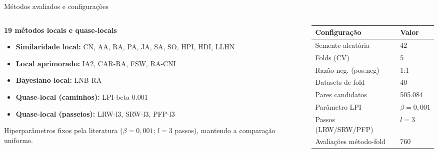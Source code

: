 \documentclass[aspectratio=169,11pt]{beamer}
\providecommand{\EspacoAposTitulo}{\vspace*{0.93cm}}
\begin{document}
\begin{frame}[t]{Métodos avaliados e configurações}

  \EspacoAposTitulo

  \begin{columns}[t]
    \begin{column}{0.56\textwidth}
      \textbf{19 métodos locais e quase-locais}
      \begin{itemize}
        \setlength{\itemsep}{0.12cm}
        \item \textbf{Similaridade local:} CN, AA, RA, PA, JA, SA, SO,
        HPI, HDI, LLHN
        \item \textbf{Local aprimorado:} IA2, CAR-RA, FSW, RA-CNI
        \item \textbf{Bayesiano local:} LNB-RA
        \item \textbf{Quase-local (caminhos):} LPI-beta-0.001
        \item \textbf{Quase-local (passeios):} LRW-l3, SRW-l3, PFP-l3
      \end{itemize}
      \vspace{0.15cm}
      {\footnotesize Hiperparâmetros fixos pela literatura
      ($\beta=0{,}001$; $l=3$ passos), mantendo a comparação uniforme.}
    \end{column}
    \begin{column}{0.42\textwidth}
      {\footnotesize
      \renewcommand{\arraystretch}{1.18}
      \begin{tabular}{ll}
        \toprule
        \textbf{Configuração} & \textbf{Valor} \\
        \midrule
        Semente aleatória     & 42 \\
        Folds (CV)            & 5 \\
        Razão neg. (pos:neg)  & 1:1 \\
        Datasets de fold      & 40 \\
        Pares candidatos      & 505.084 \\
        Parâmetro LPI         & $\beta=0{,}001$ \\
        Passos (LRW/SRW/PFP)  & $l=3$ \\
        Avaliações método-fold& 760 \\
        \bottomrule
      \end{tabular}}
    \end{column}
  \end{columns}

\end{frame}
\end{document}
